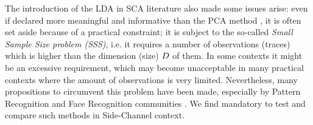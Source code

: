 \medskip
The introduction of the LDA in SCA literature also made some issues arise: even if declared more meaningful and informative than the PCA method \cite{Standaert2008}, it is often set aside because of a practical constraint; it is subject to the so-called {\em Small Sample Size problem (SSS)}, i.e. it requires a number of observations (traces) which is higher than the dimension (size) $D$ of them. In some contexts it might be an excessive requirement, which may become unacceptable in many practical contexts where the amount of observations is very limited. Nevertheless, many propositions to circumvent this problem have been made, especially by Pattern Recognition and Face Recognition communities \cite{eigenfaces,Chen2000,huang,Yu01adirect}. We find mandatory to test and compare such methods in Side-Channel context.